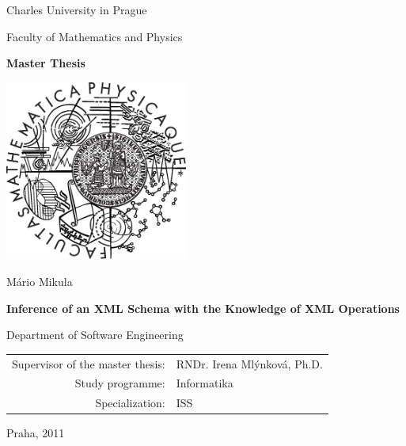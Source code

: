 \documentclass[12pt,a4paper]{report}
\def\mftitle{Inference of an XML Schema with the Knowledge of XML Operations}
\def\mfthesistype{Master Thesis}
\def\mfauthor{Mário Mikula}
\def\mfadvisor{RNDr. Irena Mlýnková, Ph.D.}
\def\mfplacedate{Praha, 2011}
\begin{document}


\pagestyle{empty}
\begin{center}

\large

Charles University in Prague

\medskip

Faculty of Mathematics and Physics

\vfill

{\bf\Large \mfthesistype}

\vfill

\centerline{\mbox{\includegraphics[width=60mm]{logo.eps}}}

\vfill
\vspace{5mm}

{\LARGE \mfauthor}

\vspace{15mm}

{\LARGE\bfseries \mftitle}

\vfill

Department of Software Engineering

\vfill

\begin{tabular}{rl}

Supervisor of the master thesis: & \mfadvisor \\
\noalign{\vspace{2mm}}
Study programme: & Informatika \\
\noalign{\vspace{2mm}}
Specialization: & ISS \\
\end{tabular}

\vfill

\mfplacedate

\end{center}
\end{document}
